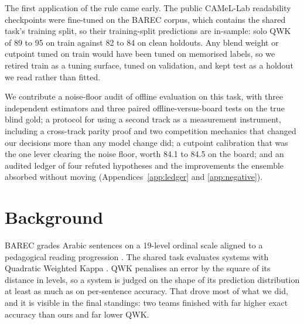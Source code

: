 \documentclass[11pt]{article}
\begin{document}
The first application of the rule came early. The public CAMeL-Lab readability checkpoints
were fine-tuned on the BAREC corpus, which contains the shared task's training split, so
their training-split predictions are in-sample: solo QWK of 89 to 95 on train against 82 to
84 on clean holdouts. Any blend weight or cutpoint tuned on train would have been tuned on
memorised labels, so we retired train as a tuning surface, tuned on validation, and kept test
as a holdout we read rather than fitted.

We contribute a noise-floor audit of offline evaluation on this task, with three independent
estimators and three paired offline-versus-board tests on the true blind gold; a protocol for
using a second track as a measurement instrument, including a cross-track parity proof and two
competition mechanics that changed our decisions more than any model change did; a cutpoint
calibration that was the one lever clearing the noise floor, worth 84.1 to 84.5 on the board;
and an audited ledger of four refuted hypotheses and the improvements the ensemble absorbed
without moving (Appendices~\ref{app:ledger} and \ref{app:negative}).

\section{Background}

BAREC grades Arabic sentences on a 19-level ordinal scale aligned to a pedagogical reading
progression \citep{elmadani-etal-2025-large,habash-etal-2025-guidelines}. The shared task
evaluates systems with Quadratic Weighted Kappa
\citep{elmadani-etal-2026-barec-shared-task}. QWK penalises an error by the square of its
distance in levels, so a system is judged on the shape of its prediction distribution at
least as much as on per-sentence accuracy. That drove most of what we did, and it is visible
in the final standings: two teams finished with far higher exact accuracy than ours and far
lower QWK.
\end{document}
